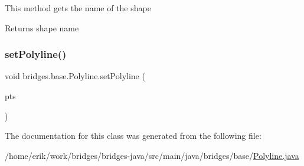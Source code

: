 This method gets the name of the shape

\begin{DoxyReturn}{Returns}
shape name 
\end{DoxyReturn}
\mbox{\label{classbridges_1_1base_1_1_polyline_a3fec0c95e9f26b173cba105bd39e9df1}} 
\subsubsection{\texorpdfstring{set\+Polyline()}{setPolyline()}}
{\footnotesize\ttfamily void bridges.\+base.\+Polyline.\+set\+Polyline (\begin{DoxyParamCaption}\item[{Array\+List$<$ Float $>$}]{pts }\end{DoxyParamCaption})}



The documentation for this class was generated from the following file\+:\begin{DoxyCompactItemize}
\item 
/home/erik/work/bridges/bridges-\/java/src/main/java/bridges/base/\hyperlink{_polyline_8java}{Polyline.\+java}\end{DoxyCompactItemize}
